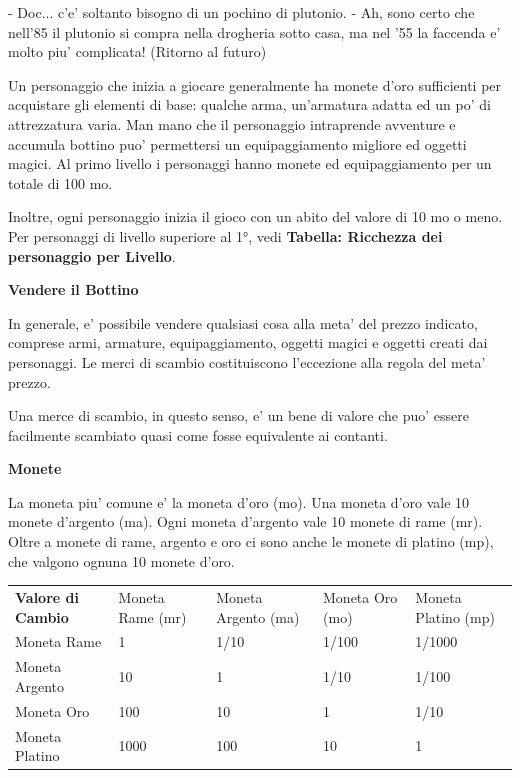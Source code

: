\documentclass[a4paper,11pt,twoside,openany]{dndbook}
\begin{document}
{\begin{quotebox}
- Doc... c'e' soltanto bisogno di un pochino di plutonio.
- Ah, sono certo che nell'85 il plutonio si compra nella drogheria sotto casa, ma nel '55 la faccenda e' molto piu' complicata! (Ritorno al futuro)
\end{quotebox}


\label{ricchezza-e-denaro}

Un personaggio che inizia a giocare generalmente ha monete d'oro sufficienti per acquistare gli elementi di base: qualche arma, un'armatura adatta ed un po' di attrezzatura varia. Man mano che il personaggio intraprende avventure e accumula bottino puo' permettersi un equipaggiamento migliore ed oggetti magici. Al primo livello i personaggi hanno monete ed equipaggiamento per un totale di 100 mo.

Inoltre, ogni personaggio inizia il gioco con un abito del valore di 10 mo o meno. Per personaggi di livello superiore al 1°, vedi \textbf{Tabella: Ricchezza dei personaggio per Livello}.

\textbf{Vendere il Bottino}

In generale, e' possibile vendere qualsiasi cosa alla meta' del prezzo indicato, comprese armi, armature, equipaggiamento, oggetti magici e oggetti creati dai personaggi. Le merci di scambio costituiscono l'eccezione alla regola del meta' prezzo.

Una merce di scambio, in questo senso, e' un bene di valore che puo' essere facilmente scambiato quasi come fosse equivalente ai contanti.

\textbf{Monete}

La moneta piu' comune e' la moneta d'oro (mo). Una moneta d'oro vale 10 monete d'argento (ma). Ogni moneta d'argento vale 10 monete di rame (mr). Oltre a monete di rame, argento e oro ci sono anche le monete di platino (mp), che valgono ognuna 10 monete d'oro.

\begin{tabular}[c]{@{}lllll@{}}
\toprule 
\textbf{Valore di Cambio} & Moneta Rame (mr) & Moneta Argento (ma) & Moneta Oro (mo) & Moneta Platino (mp)\tabularnewline
Moneta Rame & 1 & 1/10 & 1/100 & 1/1000\tabularnewline
Moneta Argento & 10 & 1 & 1/10 & 1/100\tabularnewline
Moneta Oro & 100 & 10 & 1 & 1/10\tabularnewline
Moneta Platino & 1000 & 100 & 10 & 1\tabularnewline
\bottomrule
\end{tabular}

\bigskip

}
\end{document}
